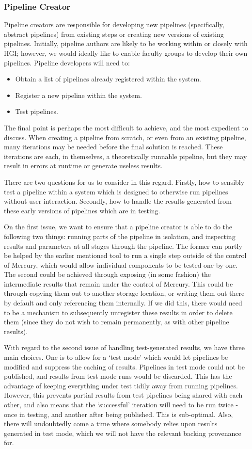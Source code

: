 \documentclass[10pt,a4paper]{article}
\newcommand{\npar}{\par\noindent\space}
\begin{document}
\subsubsection{Pipeline Creator}
\npar Pipeline creators are responsible for developing new pipelines (specifically, \glspl{abstract pipeline}) from existing steps or creating new versions of existing pipelines. Initially, pipeline authors are likely to be working within or closely with HGI; however, we would ideally like to enable faculty groups to develop their own pipelines. Pipeline developers will need to:
\begin{itemize}
\item Obtain a list of pipelines already registered within the system.
\item Register a new pipeline within the system.
\item Test pipelines.
\end{itemize}
\npar The final point is perhaps the most difficult to achieve, and the most expedient to discuss. When creating a pipeline from scratch, or even from an existing pipeline, many iterations may be needed before the final solution is reached. These iterations are each, in themselves, a theoretically runnable pipeline, but they may result in errors at runtime or generate useless results.
\npar There are two questions for us to consider in this regard. Firstly, how to sensibly test a pipeline within a system which is designed to otherwise run pipelines without user interaction. Secondly, how to handle the results generated from these early versions of pipelines which are in testing.
\npar On the first issue, we want to ensure that a pipeline creator is able to do the following two things: running parts of the pipeline in isolation, and inspecting results and parameters at all stages through the pipeline. The former can partly be helped by the earlier mentioned tool to run a single step outside of the control of Mercury, which would allow individual components to be tested one-by-one. The second could be achieved through exposing (in some fashion) the intermediate results that remain under the control of Mercury. This could be through copying them out to another storage location, or writing them out there by default and only referencing them internally. If we did this, there would need to be a mechanism to subsequently unregister these results in order to delete them (since they do not wish to remain permanently, as with other pipeline results). 
\npar With regard to the second issue of handling test-generated results, we have three main choices. One is to allow for a `test mode' which would let pipelines be modified and suppress the caching of results. Pipelines in test mode could not be published, and results from test mode runs would be discarded. This has the advantage of keeping everything under test tidily away from running pipelines. However, this prevents partial results from test pipelines being shared with each other, and also means that the `successful' iteration will need to be run twice - once in testing, and another after being published. This is sub-optimal. Also, there will undoubtedly come a time where somebody relies upon results generated in test mode, which we will not have the relevant backing provenance for.
\end{document}
